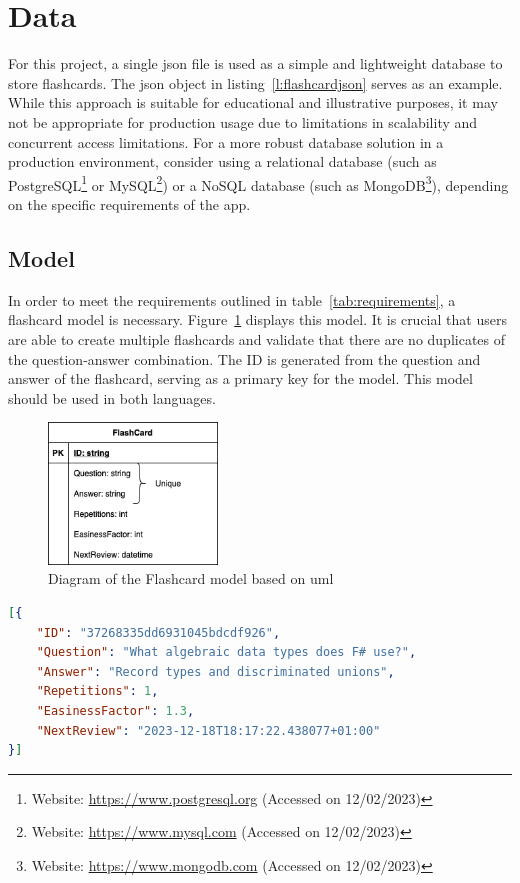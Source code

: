     \section{Data}\label{sec:data}
    For this project, a single \ac{json} file is used as a simple and lightweight database to store flashcards. The \ac{json} object in listing\ \ref{l:flashcardjson} serves as an example. While this approach is suitable for educational and illustrative purposes, it may not be appropriate for production usage due to limitations in scalability and concurrent access limitations. For a more robust database solution in a production environment, consider using a relational database (such as PostgreSQL\footnote{Website: \url{https://www.postgresql.org} (Accessed on 12/02/2023)} or MySQL\footnote{Website: \url{https://www.mysql.com} (Accessed on 12/02/2023)}) or a NoSQL database (such as MongoDB\footnote{Website: \url{https://www.mongodb.com} (Accessed on 12/02/2023)}), depending on the specific requirements of the \ac{app}.

    \subsection*{Model}
    In order to meet the requirements outlined in table\ \ref{tab:requirements}, a flashcard model is necessary. Figure\ \ref{fig:model} displays this model. It is crucial that users are able to create multiple flashcards and validate that there are no duplicates of the question-answer combination. The ID is generated from the question and answer of the flashcard, serving as a primary key for the model. This model should be used in both languages.

    \begin{figure}
        \centering
        \includegraphics[width=0.4\textwidth]{NerddeckModel.png}
        \caption{Diagram of the Flashcard model based on \ac{uml}}\label{fig:model}
    \end{figure}

\begin{lstlisting}[language=json,firstnumber=1,float=tp, caption={Example of how a flashcard object is saved inside a \ac{json} file}, label=l:flashcardjson]
[{
    "ID": "37268335dd6931045bdcdf926",
    "Question": "What algebraic data types does F# use?",
    "Answer": "Record types and discriminated unions",
    "Repetitions": 1,
    "EasinessFactor": 1.3,
    "NextReview": "2023-12-18T18:17:22.438077+01:00"
}]   
\end{lstlisting}


